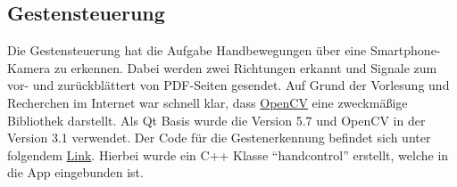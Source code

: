 \subsection{Gestensteuerung}
\thispagestyle{fancy}

Die Gestensteuerung hat die Aufgabe Handbewegungen über eine Smartphone-Kamera zu erkennen. Dabei werden zwei Richtungen erkannt und Signale zum vor- und zurückblättert von PDF-Seiten gesendet. Auf Grund der Vorlesung und Recherchen im Internet war schnell klar, dass \href{http://opencv.org/}{OpenCV} eine zweckmäßige Bibliothek darstellt. Als Qt Basis wurde die Version 5.7 und OpenCV in der Version 3.1 verwendet. Der Code für die Gestenerkennung befindet sich unter folgendem \href{https://github.com/BeckmaR/EmbeddedMultimediaSS2016/tree/master/src/handcontrol}{Link}. Hierbei wurde ein C++ Klasse "`handcontrol"' erstellt, welche in die App eingebunden ist.

